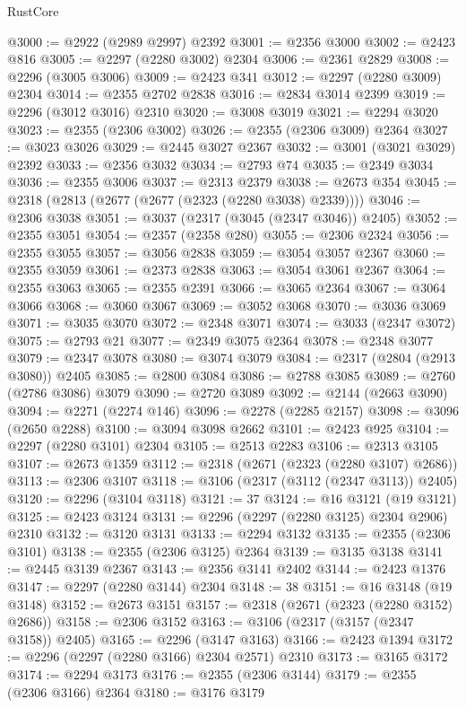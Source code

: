 \begin{lexlean}{RustCore}
\begin{coremodule}
@3000 := @2922 (@2989 @2997) @2392
@3001 := @2356 @3000
@3002 := @2423 @816
@3005 := @2297 (@2280 @3002) @2304
@3006 := @2361 @2829
@3008 := @2296 (@3005 @3006)
@3009 := @2423 @341
@3012 := @2297 (@2280 @3009) @2304
@3014 := @2355 @2702 @2838
@3016 := @2834 @3014 @2399
@3019 := @2296 (@3012 @3016) @2310
@3020 := @3008 @3019
@3021 := @2294 @3020
@3023 := @2355 (@2306 @3002)
@3026 := @2355 (@2306 @3009) @2364
@3027 := @3023 @3026
@3029 := @2445 @3027 @2367
@3032 := @3001 (@3021 @3029) @2392
@3033 := @2356 @3032
@3034 := @2793 @74
@3035 := @2349 @3034
@3036 := @2355 @3006
@3037 := @2313 @2379
@3038 := @2673 @354
@3045 := @2318 (@2813 (@2677 (@2677 (@2323 (@2280 @3038) @2339))))
@3046 := @2306 @3038
@3051 := @3037 (@2317 (@3045 (@2347 @3046)) @2405)
@3052 := @2355 @3051
@3054 := @2357 (@2358 @280)
@3055 := @2306 @2324
@3056 := @2355 @3055
@3057 := @3056 @2838
@3059 := @3054 @3057 @2367
@3060 := @2355 @3059
@3061 := @2373 @2838
@3063 := @3054 @3061 @2367
@3064 := @2355 @3063
@3065 := @2355 @2391
@3066 := @3065 @2364
@3067 := @3064 @3066
@3068 := @3060 @3067
@3069 := @3052 @3068
@3070 := @3036 @3069
@3071 := @3035 @3070
@3072 := @2348 @3071
@3074 := @3033 (@2347 @3072)
@3075 := @2793 @21
@3077 := @2349 @3075 @2364
@3078 := @2348 @3077
@3079 := @2347 @3078
@3080 := @3074 @3079
@3084 := @2317 (@2804 (@2913 @3080)) @2405
@3085 := @2800 @3084
@3086 := @2788 @3085
@3089 := @2760 (@2786 @3086) @3079
@3090 := @2720 @3089
@3092 := @2144 (@2663 @3090)
@3094 := @2271 (@2274 @146)
@3096 := @2278 (@2285 @2157)
@3098 := @3096 (@2650 @2288)
@3100 := @3094 @3098 @2662
@3101 := @2423 @925
@3104 := @2297 (@2280 @3101) @2304
@3105 := @2513 @2283
@3106 := @2313 @3105
@3107 := @2673 @1359
@3112 := @2318 (@2671 (@2323 (@2280 @3107) @2686))
@3113 := @2306 @3107
@3118 := @3106 (@2317 (@3112 (@2347 @3113)) @2405)
@3120 := @2296 (@3104 @3118)
@3121 := 37
@3124 := @16 @3121 (@19 @3121)
@3125 := @2423 @3124
@3131 := @2296 (@2297 (@2280 @3125) @2304 @2906) @2310
@3132 := @3120 @3131
@3133 := @2294 @3132
@3135 := @2355 (@2306 @3101)
@3138 := @2355 (@2306 @3125) @2364
@3139 := @3135 @3138
@3141 := @2445 @3139 @2367
@3143 := @2356 @3141 @2402
@3144 := @2423 @1376
@3147 := @2297 (@2280 @3144) @2304
@3148 := 38
@3151 := @16 @3148 (@19 @3148)
@3152 := @2673 @3151
@3157 := @2318 (@2671 (@2323 (@2280 @3152) @2686))
@3158 := @2306 @3152
@3163 := @3106 (@2317 (@3157 (@2347 @3158)) @2405)
@3165 := @2296 (@3147 @3163)
@3166 := @2423 @1394
@3172 := @2296 (@2297 (@2280 @3166) @2304 @2571) @2310
@3173 := @3165 @3172
@3174 := @2294 @3173
@3176 := @2355 (@2306 @3144)
@3179 := @2355 (@2306 @3166) @2364
@3180 := @3176 @3179

\end{coremodule}
\end{lexlean}
